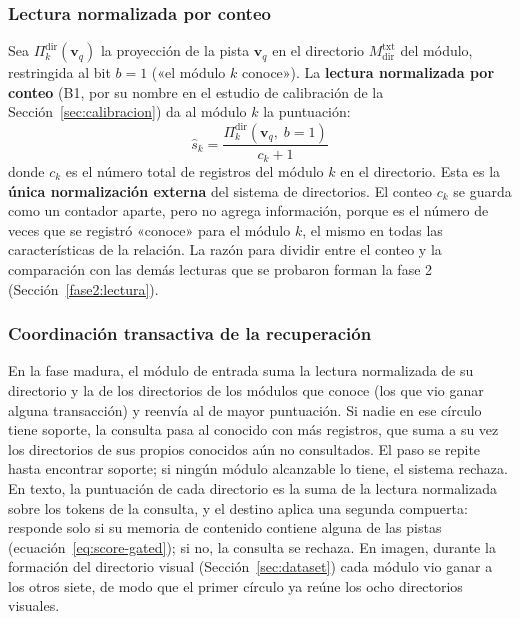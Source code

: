 \subsubsection*{Lectura normalizada por conteo}

Sea $\Pi^{\mathrm{dir}}_k(\mathbf{v}_q)$ la proyección de la pista $\mathbf{v}_q$
en el directorio $M^{\mathrm{txt}}_{\mathrm{dir}}$ del módulo, restringida al bit $b=1$
(«el módulo $k$ conoce»).
La \textbf{lectura normalizada por conteo} (B1, por su nombre en el estudio de
calibración de la Sección~\ref{sec:calibracion}) da al módulo $k$ la puntuación:
\begin{equation}
    \hat{s}_k = \frac{\Pi^{\mathrm{dir}}_k(\mathbf{v}_q,\; b{=}1)}{c_k + 1}
    \label{eq:b1}
\end{equation}
donde $c_k$ es el número total de registros del módulo $k$ en el directorio.
Esta es la \textbf{única normalización externa} del sistema de directorios.
El conteo $c_k$ se guarda como un contador aparte, pero no agrega información, porque es el
número de veces que se registró «conoce» para el módulo $k$, el mismo en todas las
características de la relación.
La razón para dividir entre el conteo y la comparación con las demás lecturas que se
probaron forman la fase 2 (Sección~\ref{fase2:lectura}).

\subsubsection*{Coordinación transactiva de la recuperación}

En la fase madura, el módulo de entrada suma la lectura normalizada de su directorio y la de los
directorios de los módulos que conoce (los que vio ganar alguna transacción) y reenvía
al de mayor puntuación.
Si nadie en ese círculo tiene soporte, la consulta pasa al conocido con más registros,
que suma a su vez los directorios de sus propios conocidos aún no consultados.
El paso se repite hasta encontrar soporte; si ningún módulo alcanzable lo tiene, el
sistema rechaza.
En texto, la puntuación de cada directorio es la suma de la lectura normalizada sobre los tokens de la
consulta, y el destino aplica una segunda compuerta: responde solo si su memoria de
contenido contiene alguna de las pistas (ecuación~\eqref{eq:score-gated}); si no, la
consulta se rechaza.
En imagen, durante la formación del directorio visual
(Sección~\ref{sec:dataset}) cada módulo vio ganar a los otros siete, de modo que el
primer círculo ya reúne los ocho directorios visuales.

